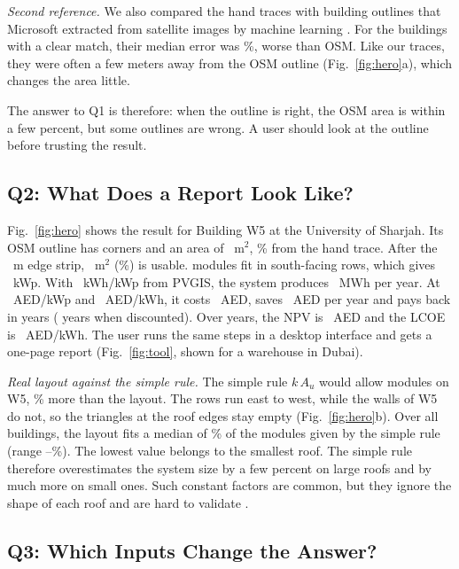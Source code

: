 \documentclass[conference]{IEEEtran}
\begin{document}
\emph{Second reference.} We also compared the hand traces with building outlines that Microsoft extracted from satellite images by machine learning \cite{msfootprints}. For the \MsmanN{} buildings with a clear match, their median error was \MsmanMedape\%, worse than OSM. Like our traces, they were often a few meters away from the OSM outline (Fig.~\ref{fig:hero}a), which changes the area little.

The answer to Q1 is therefore: when the outline is right, the OSM area is within a few percent, but some outlines are wrong. A user should look at the outline before trusting the result.

\subsection{Q2: What Does a Report Look Like?}
\label{sec:q2}

Fig.~\ref{fig:hero} shows the result for Building W5 at the University of Sharjah. Its OSM outline has \CaseVertices{} corners and an area of \CaseArea~m$^2$, \CaseManErr\% from the hand trace. After the \CfgSetback~m edge strip, \CaseUsable~m$^2$ (\CaseUsablePct\%) is usable. \CaseModules{} modules fit in south-facing rows, which gives \CasePdc~kWp. With \CaseSy~kWh/kWp from PVGIS, the system produces \CaseEnergy~MWh per year. At \CfgCost~AED/kWp and \CfgTariff~AED/kWh, it costs \CaseCapex~AED, saves \CaseSavings~AED per year and pays back in \CasePayback{} years (\CaseDiscPayback{} years when discounted). Over \CfgLife{} years, the NPV is \CaseNpv~AED and the LCOE is \CaseLcoe~AED/kWh. The user runs the same steps in a desktop interface and gets a one-page report (Fig.~\ref{fig:tool}, shown for a warehouse in Dubai).

\emph{Real layout against the simple rule.} The simple rule $k\,A_u$ would allow \CaseModulesRule{} modules on W5, \CaseRuleGap\% more than the layout. The rows run east to west, while the walls of W5 do not, so the triangles at the roof edges stay empty (Fig.~\ref{fig:hero}b). Over all \LcN{} buildings, the layout fits a median of \LcMedian\% of the modules given by the simple rule (range \LcMin--\LcMax\%). The lowest value belongs to the smallest roof. The simple rule therefore overestimates the system size by a few percent on large roofs and by much more on small ones. Such constant factors are common, but they ignore the shape of each roof and are hard to validate \cite{melius2013}.

\subsection{Q3: Which Inputs Change the Answer?}
\end{document}
